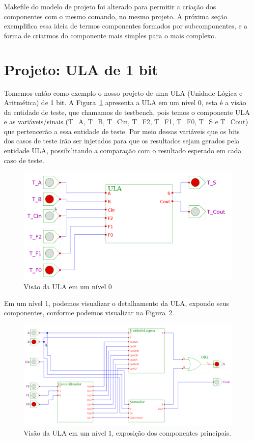 \documentclass[a4paper,11pt]{report}
\begin{document}
Makefile do modelo de projeto foi alterado para permitir a criação dos componentes com o mesmo comando, no mesmo projeto. A próxima seção exemplifica essa ideia de termos componentes formados por subcomponentes, e a forma de criarmos do componente mais simples para o mais complexo.

\section{Projeto: ULA de 1 bit}

Tomemos então como exemplo o nosso projeto de uma ULA (Unidade Lógica e Aritmética) de 1 bit. A Figura~\ref{fig:ULA_000} apresenta a ULA em um nível 0, esta é a visão da entidade de teste, que chamamos de testbench, pois temos o componente ULA e as variáveis/sinais (T\_A, T\_B, T\_Cin, T\_F2, T\_F1, T\_F0, T\_S e T\_Cout) que pertencerão a essa entidade de teste.
Por meio dessas variáveis que os bits dos casos de teste irão ser injetados para que os resultados sejam gerados pela entidade ULA, possibilitando a comparação com o resultado esperado em cada caso de teste.

\begin{figure}[H]
\centering
\includegraphics[width=1\textwidth]{figuras/ULA_000.png}
\caption{Visão da ULA em um nível 0}
\label{fig:ULA_000}
\end{figure}

Em um nível 1, podemos visualizar o detalhamento da ULA, expondo seus componentes, conforme podemos visualizar na Figura~\ref{fig:ULA_001}.

\begin{figure}[H]
\centering
\includegraphics[width=1\textwidth]{figuras/ULA_001.png}
\caption{Visão da ULA em um nível 1, exposição dos componentes principais.}
\label{fig:ULA_001}
\end{figure}
\end{document}

